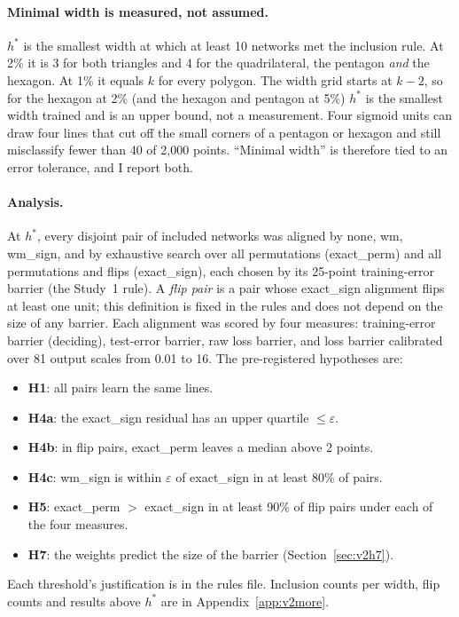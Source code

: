 \documentclass[11pt]{article}
\newcommand{\md}[1]{\textsf{#1}}
\newcommand{\eps}{\varepsilon}
\begin{document}
\paragraph{Minimal width is measured, not assumed.} $h^*$ is the smallest width at which at least 10 networks met the inclusion rule. At 2\% it is 3 for both triangles and 4 for the quadrilateral, the pentagon \emph{and} the hexagon. At 1\% it equals $k$ for every polygon. The width grid starts at $k-2$, so for the hexagon at 2\% (and the hexagon and pentagon at 5\%) $h^*$ is the smallest width trained and is an upper bound, not a measurement. Four sigmoid units can draw four lines that cut off the small corners of a pentagon or hexagon and still misclassify fewer than 40 of 2{,}000 points. ``Minimal width'' is therefore tied to an error tolerance, and I report both.

\paragraph{Analysis.} At $h^*$, every disjoint pair of included networks was aligned by \md{none}, \md{wm}, \md{wm\_sign}, and by exhaustive search over all permutations (\md{exact\_perm}) and all permutations and flips (\md{exact\_sign}), each chosen by its 25-point training-error barrier (the Study~1 rule). A \emph{flip pair} is a pair whose \md{exact\_sign} alignment flips at least one unit; this definition is fixed in the rules and does not depend on the size of any barrier. Each alignment was scored by four measures: training-error barrier (deciding), test-error barrier, raw loss barrier, and loss barrier calibrated over 81 output scales from 0.01 to 16. The pre-registered hypotheses are:
\begin{itemize}[leftmargin=*]
\item \textbf{H1}: all pairs learn the same lines.
\item \textbf{H4a}: the \md{exact\_sign} residual has an upper quartile $\le \eps$.
\item \textbf{H4b}: in flip pairs, \md{exact\_perm} leaves a median above 2 points.
\item \textbf{H4c}: \md{wm\_sign} is within $\eps$ of \md{exact\_sign} in at least 80\% of pairs.
\item \textbf{H5}: \md{exact\_perm} $>$ \md{exact\_sign} in at least 90\% of flip pairs under each of the four measures.
\item \textbf{H7}: the weights predict the size of the barrier (Section~\ref{sec:v2h7}).
\end{itemize}
Each threshold's justification is in the rules file. Inclusion counts per width, flip counts and results above $h^*$ are in Appendix~\ref{app:v2more}.
\end{document}
